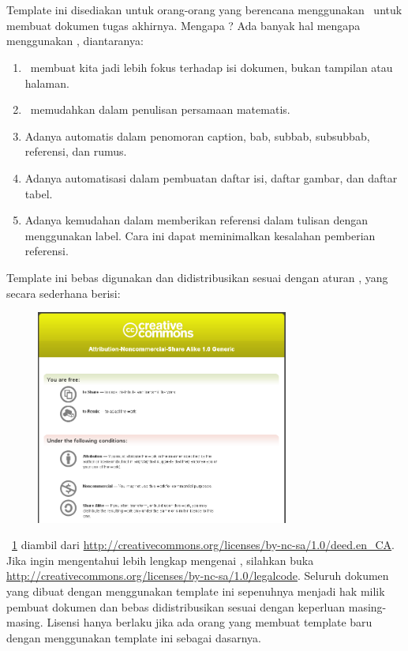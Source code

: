 \chapter*{\kataPengantar}

Template ini disediakan untuk orang-orang yang berencana menggunakan 
\latex~untuk membuat dokumen tugas akhirnya. Mengapa \latex? Ada banyak hal mengapa menggunakan \latex, diantaranya:

\begin{enumerate}
	\item \latex~membuat kita jadi lebih fokus terhadap isi dokumen, bukan tampilan atau halaman. 
	\item \latex~memudahkan dalam penulisan persamaan matematis. 
	\item Adanya automatis dalam penomoran caption, bab, subbab, subsubbab, referensi, dan rumus. 
	\item Adanya automatisasi dalam pembuatan daftar isi, daftar gambar, dan daftar tabel.
	\item Adanya kemudahan dalam memberikan referensi dalam tulisan dengan menggunakan label. Cara ini dapat meminimalkan kesalahan pemberian referensi. 
\end{enumerate}

Template ini bebas digunakan dan didistribusikan sesuai dengan aturan \license, yang secara sederhana berisi: 

\begin{figure}
	\centering
	\includegraphics[width=0.74\textwidth]
		{pics/creative_common.png}
	\caption{\license}
	\label{fig:lisensi}
\end{figure}

\pic~\ref{fig:lisensi} diambil dari 
\url{http://creativecommons.org/licenses/by-nc-sa/1.0/deed.en_CA}.  Jika ingin mengentahui lebih lengkap mengenai \license, silahkan buka \url{http://creativecommons.org/licenses/by-nc-sa/1.0/legalcode}.  Seluruh dokumen yang dibuat dengan menggunakan template ini sepenuhnya menjadi hak milik pembuat dokumen dan bebas didistribusikan sesuai dengan keperluan masing-masing. Lisensi hanya berlaku jika ada orang yang membuat template baru dengan menggunakan template ini sebagai dasarnya. 


